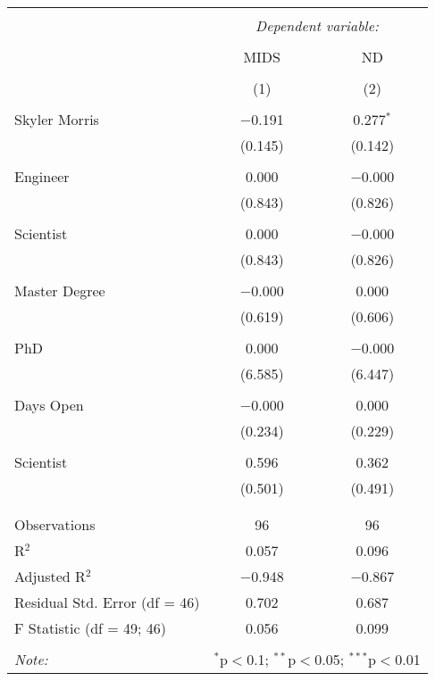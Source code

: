 \documentclass[11pt, oneside]{article}
\begin{document}
 

\begin{table}[!htbp] \centering 
  \caption{} 
  \label{} 
\begin{tabular}{@{\extracolsep{5pt}}lcc} 
\\[-1.8ex]\hline 
\hline \\[-1.8ex] 
 & \multicolumn{2}{c}{\textit{Dependent variable:}} \\ 
\cline{2-3} 
\\[-1.8ex] & MIDS & ND \\ 
\\[-1.8ex] & (1) & (2)\\ 
\hline \\[-1.8ex] 
 Skyler Morris & $-$0.191 & 0.277$^{*}$ \\ 
  & (0.145) & (0.142) \\ 
  & & \\ 
 Engineer & 0.000 & $-$0.000 \\ 
  & (0.843) & (0.826) \\ 
  & & \\ 
 Scientist & 0.000 & $-$0.000 \\ 
  & (0.843) & (0.826) \\ 
  & & \\ 
 Master Degree & $-$0.000 & 0.000 \\ 
  & (0.619) & (0.606) \\ 
  & & \\ 
 PhD & 0.000 & $-$0.000 \\ 
  & (6.585) & (6.447) \\ 
  & & \\ 
 Days Open & $-$0.000 & 0.000 \\ 
  & (0.234) & (0.229) \\ 
  & & \\ 
 Scientist & 0.596 & 0.362 \\ 
  & (0.501) & (0.491) \\ 
  & & \\ 
\hline \\[-1.8ex] 
Observations & 96 & 96 \\ 
R$^{2}$ & 0.057 & 0.096 \\ 
Adjusted R$^{2}$ & $-$0.948 & $-$0.867 \\ 
Residual Std. Error (df = 46) & 0.702 & 0.687 \\ 
F Statistic (df = 49; 46) & 0.056 & 0.099 \\ 
\hline 
\hline \\[-1.8ex] 
\textit{Note:}  & \multicolumn{2}{r}{$^{*}$p$<$0.1; $^{**}$p$<$0.05; $^{***}$p$<$0.01} \\ 
\end{tabular} 
\end{table} 
\end{document}
